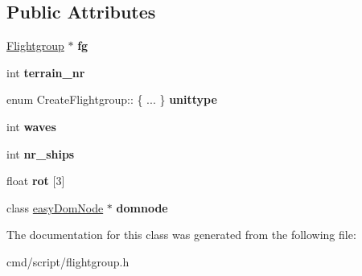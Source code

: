 \subsection*{Public Attributes}
\begin{DoxyCompactItemize}
\item 
\hyperlink{classFlightgroup}{Flightgroup} $\ast$ {\bfseries fg}\hypertarget{classCreateFlightgroup_a6ebb08f91eecb863138d5e183d6cf8c0}{}\label{classCreateFlightgroup_a6ebb08f91eecb863138d5e183d6cf8c0}

\item 
int {\bfseries terrain\+\_\+nr}\hypertarget{classCreateFlightgroup_ae12ef133e2cdfabb74efacc12a8d37a2}{}\label{classCreateFlightgroup_ae12ef133e2cdfabb74efacc12a8d37a2}

\item 
enum Create\+Flightgroup\+:: \{ ... \}  {\bfseries unittype}\hypertarget{classCreateFlightgroup_ad919bc0389ecc05d979e766184ef2556}{}\label{classCreateFlightgroup_ad919bc0389ecc05d979e766184ef2556}

\item 
int {\bfseries waves}\hypertarget{classCreateFlightgroup_a5ed394b10d9a9b157f9111f39c0a5588}{}\label{classCreateFlightgroup_a5ed394b10d9a9b157f9111f39c0a5588}

\item 
int {\bfseries nr\+\_\+ships}\hypertarget{classCreateFlightgroup_a033c3716b8420429850b0f01261654a4}{}\label{classCreateFlightgroup_a033c3716b8420429850b0f01261654a4}

\item 
float {\bfseries rot} \mbox{[}3\mbox{]}\hypertarget{classCreateFlightgroup_afad3b624a06b9de45c7378faf31def62}{}\label{classCreateFlightgroup_afad3b624a06b9de45c7378faf31def62}

\item 
class \hyperlink{classeasyDomNode}{easy\+Dom\+Node} $\ast$ {\bfseries domnode}\hypertarget{classCreateFlightgroup_a0a9103134c52e013f8ff2b0bb8c40872}{}\label{classCreateFlightgroup_a0a9103134c52e013f8ff2b0bb8c40872}

\end{DoxyCompactItemize}


The documentation for this class was generated from the following file\+:\begin{DoxyCompactItemize}
\item 
cmd/script/flightgroup.\+h\end{DoxyCompactItemize}

